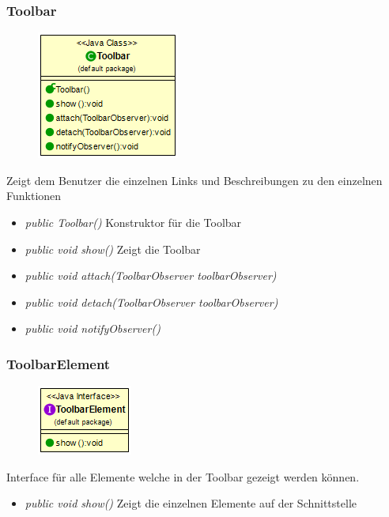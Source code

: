 \subsubsection{Toolbar}
\begin{minipage}{0.3\textwidth}
    \begin{figure}[H]
        \includegraphics[scale = 0.5
        ]{media/view/toolbar/Toolbar_Class.png}
    \end{figure}
    \end{minipage} \hfill
    \begin{minipage}{0.6\textwidth}
Zeigt dem Benutzer die einzelnen Links und Beschreibungen zu den einzelnen Funktionen
\end{minipage}
\begin{itemize} [noitemsep]
    \item \emph{public Toolbar()} Konstruktor für die Toolbar
    \item \emph{public void show()} Zeigt die Toolbar
    \item \emph{public void attach(ToolbarObserver toolbarObserver)}
    \item \emph{public void detach(ToolbarObserver toolbarObserver)}
    \item \emph{public void notifyObserver()}
\end{itemize}

\subsubsection{ToolbarElement}
\begin{minipage}{0.3\textwidth}
    \begin{figure}[H]
        \includegraphics[scale = 0.5
        ]{media/view/toolbar/ToolbarElement.png}
    \end{figure}
    \end{minipage} \hfill
    \begin{minipage}{0.6\textwidth}
Interface für alle Elemente welche in der Toolbar gezeigt werden können.
\end{minipage}
\begin{itemize} [noitemsep]
    \item \emph{public void show()} Zeigt die einzelnen Elemente auf der Schnittstelle
\end{itemize}

